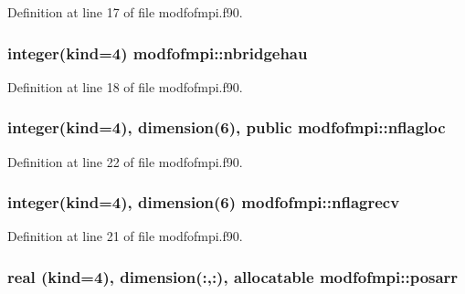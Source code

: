 Definition at line 17 of file modfofmpi.\+f90.

\subsubsection[{\texorpdfstring{nbridgehau}{nbridgehau}}]{\setlength{\rightskip}{0pt plus 5cm}integer(kind=4) modfofmpi\+::nbridgehau}\hypertarget{namespacemodfofmpi_a81ecc186519e9addf2dbf7ec92e32d23}{}\label{namespacemodfofmpi_a81ecc186519e9addf2dbf7ec92e32d23}


Definition at line 18 of file modfofmpi.\+f90.

\subsubsection[{\texorpdfstring{nflagloc}{nflagloc}}]{\setlength{\rightskip}{0pt plus 5cm}integer(kind=4), dimension(6), public modfofmpi\+::nflagloc}\hypertarget{namespacemodfofmpi_a9b2252c09a83a3f47fc6aec6462a68dc}{}\label{namespacemodfofmpi_a9b2252c09a83a3f47fc6aec6462a68dc}


Definition at line 22 of file modfofmpi.\+f90.

\subsubsection[{\texorpdfstring{nflagrecv}{nflagrecv}}]{\setlength{\rightskip}{0pt plus 5cm}integer(kind=4), dimension(6) modfofmpi\+::nflagrecv}\hypertarget{namespacemodfofmpi_aa8c0fc08baf8d208d7e2cddd0600ff99}{}\label{namespacemodfofmpi_aa8c0fc08baf8d208d7e2cddd0600ff99}


Definition at line 21 of file modfofmpi.\+f90.

\subsubsection[{\texorpdfstring{posarr}{posarr}}]{\setlength{\rightskip}{0pt plus 5cm}real (kind=4), dimension(\+:,\+:), allocatable modfofmpi\+::posarr}\hypertarget{namespacemodfofmpi_a240c326e64798f0d4f7fd2a785eaddfb}{}\label{namespacemodfofmpi_a240c326e64798f0d4f7fd2a785eaddfb}


